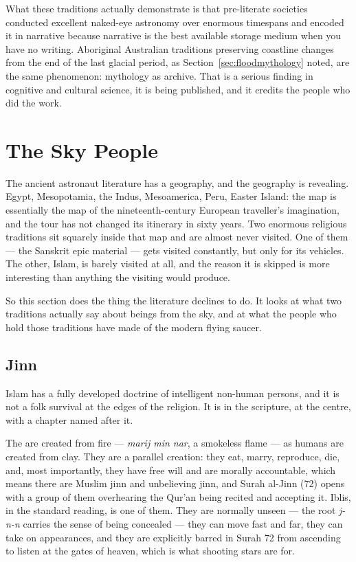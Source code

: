 What these traditions actually demonstrate is that pre-literate societies conducted excellent
naked-eye astronomy over enormous timespans and encoded it in narrative because narrative is
the best available storage medium when you have no writing. Aboriginal Australian traditions
preserving coastline changes from the end of the last glacial period, as Section~\ref{sec:floodmythology} noted, are
the same phenomenon: mythology as archive. That is a serious finding in cognitive and cultural
science, it is being published, and it credits the people who did the work.

\section{The Sky People}\label{sec:skypeople}

The ancient astronaut literature has a geography, and the geography is revealing. Egypt,
Mesopotamia, the Indus, Mesoamerica, Peru, Easter Island: the map is essentially the map of the
nineteenth-century European traveller's imagination, and the tour has not changed its itinerary in
sixty years. Two enormous religious traditions sit squarely inside that map and are almost never
visited. One of them --- the Sanskrit epic material --- gets visited constantly, but only for its
vehicles. The other, Islam, is barely visited at all, and the reason it is skipped is more
interesting than anything the visiting would produce.

So this section does the thing the literature declines to do. It looks at what two traditions
actually say about beings from the sky, and at what the people who hold those traditions have
made of the modern flying saucer.

\subsection{Jinn}\label{sec:jinn}

Islam has a fully developed doctrine of intelligent non-human persons, and it is not a folk
survival at the edges of the religion. It is in the scripture, at the centre, with a chapter named
after it.

The  are created from fire --- \emph{marij min nar}, a smokeless flame --- as humans
are created from clay. They are a parallel creation: they eat, marry, reproduce, die, and, most
importantly, they have free will and are morally accountable, which means there are Muslim jinn
and unbelieving jinn, and Surah al-Jinn (72) opens with a group of them overhearing the Qur'an
being recited and accepting it. Iblis, in the standard reading, is one of them. They are normally
unseen --- the root \emph{j-n-n} carries the sense of being concealed --- they can move fast and
far, they can take on appearances, and they are explicitly barred in Surah 72 from ascending to
listen at the gates of heaven, which is what shooting stars are for.

